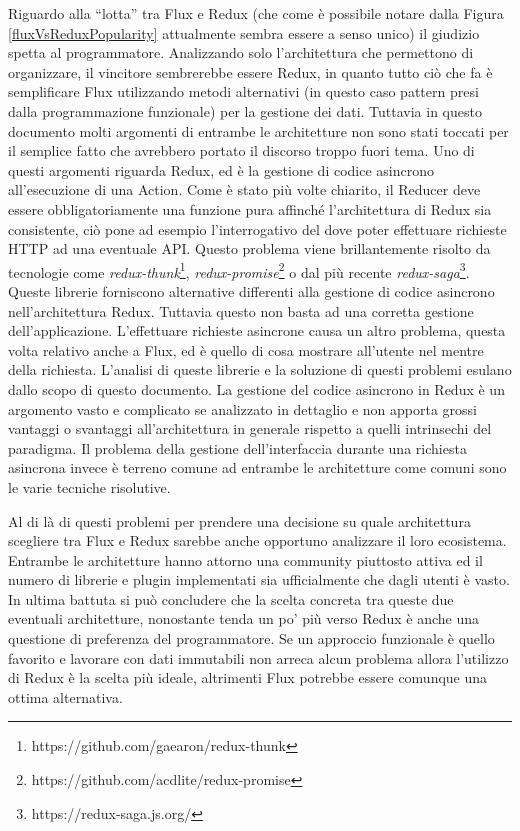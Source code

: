 Riguardo alla “lotta” tra Flux e Redux (che come è possibile notare dalla Figura \ref{fluxVsReduxPopularity} attualmente sembra essere a senso unico) il giudizio spetta al programmatore. Analizzando solo l'architettura che permettono di organizzare, il vincitore sembrerebbe essere Redux, in quanto tutto ciò che fa è semplificare Flux utilizzando metodi alternativi (in questo caso pattern presi dalla programmazione funzionale) per la gestione dei dati. Tuttavia in questo documento molti argomenti di entrambe le architetture non sono stati toccati per il semplice fatto che avrebbero portato il discorso troppo fuori tema.
Uno di questi argomenti riguarda Redux, ed è la gestione di codice asincrono all'esecuzione di una Action. Come è stato più volte chiarito, il Reducer deve essere obbligatoriamente una funzione pura affinché l'architettura di Redux sia consistente, ciò pone ad esempio l'interrogativo del dove poter effettuare richieste HTTP ad una eventuale API. Questo problema viene brillantemente risolto da tecnologie come \textit{redux-thunk}\footnote{https://github.com/gaearon/redux-thunk}, \textit{redux-promise}\footnote{https://github.com/acdlite/redux-promise} o dal più recente \textit{redux-saga}\footnote{https://redux-saga.js.org/}. Queste librerie forniscono alternative differenti alla gestione di codice asincrono nell'architettura Redux. Tuttavia questo non basta ad una corretta gestione dell'applicazione. L'effettuare richieste asincrone causa un altro problema, questa volta relativo anche a Flux, ed è quello di cosa mostrare all'utente nel mentre della richiesta. L'analisi di queste librerie e la soluzione di questi problemi esulano dallo scopo di questo documento. La gestione del codice asincrono in Redux è un argomento vasto e complicato se analizzato in dettaglio e non apporta grossi vantaggi o svantaggi all'architettura in generale rispetto a quelli intrinsechi del paradigma. Il problema della gestione dell'interfaccia durante una richiesta asincrona invece è terreno comune ad entrambe le architetture come comuni sono le varie tecniche risolutive.

Al di là di questi problemi per prendere una decisione su quale architettura scegliere tra Flux e Redux sarebbe anche opportuno analizzare il loro ecosistema. Entrambe le architetture hanno attorno una community piuttosto attiva ed il numero di librerie e plugin implementati sia ufficialmente che dagli utenti è vasto.
In ultima battuta si può concludere che la scelta concreta tra queste due eventuali architetture, nonostante tenda un po' più verso Redux è anche una questione di preferenza del programmatore. Se un approccio funzionale è quello favorito e lavorare con dati immutabili non arreca alcun problema allora l'utilizzo di Redux è la scelta più ideale, altrimenti Flux potrebbe essere comunque una ottima alternativa.